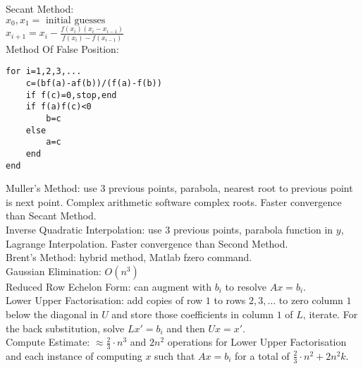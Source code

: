 Secant Method: \\
$x_0,x_1 = \text{ initial guesses}$ \\
$x_{i+1} = x_i - \frac{f(x_i)(x_i-x_{i-1})}{f(x_i)-f(x_{i-1})}$ \\
Method Of False Position:
\begin{verbatim}
for i=1,2,3,...
    c=(bf(a)-af(b))/(f(a)-f(b))
    if f(c)=0,stop,end
    if f(a)f(c)<0
        b=c
    else
        a=c
    end
end
\end{verbatim}
Muller's Method: use $3$ previous points, parabola, nearest root to previous point is next point. Complex arithmetic software complex roots. Faster convergence than Secant Method. \\
Inverse Quadratic Interpolation: use $3$ previous points, parabola function in $y$, Lagrange Interpolation. Faster convergence than Second Method. \\
Brent's Method: hybrid method, Matlab fzero command. \\
Gaussian Elimination: $O(n^3)$ \\
Reduced Row Echelon Form: can augment with $b_i$ to resolve $Ax = b_i$. \\
Lower Upper Factorisation: add copies of row $1$ to rows $2,3,\dots$ to zero column $1$ below the diagonal in $U$ and store those coefficients in column $1$ of $L$, iterate. For the back substitution, solve $L x' = b_i$ and then $U x = x'$. \\
Compute Estimate: $\approx \frac{2}{3} \cdot n^3$ and $2n^2$ operations for Lower Upper Factorisation and each instance of computing $x$ such that $Ax = b_i$ for a total of $\frac{2}{3} \cdot n^2 + 2 n^2 k$.